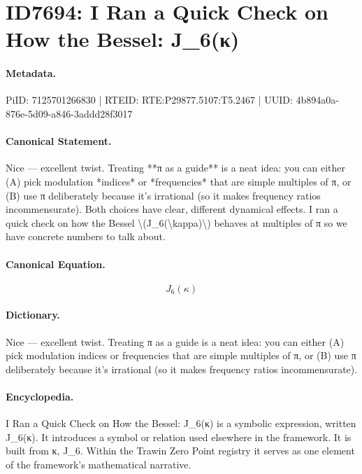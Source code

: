 \section*{ID7694: I Ran a Quick Check on How the Bessel: J\_6(κ)}
\paragraph{Metadata.}
PiID: 7125701266830 | RTEID: RTE:P29877.5107:T5.2467 | UUID: 4b894a0a-876e-5d09-a846-3addd28f3017

\paragraph{Canonical Statement.}
Nice — excellent twist. Treating **π as a guide** is a neat idea: you can either (A) pick modulation *indices* or *frequencies* that are simple multiples of π, or (B) use π deliberately because it’s irrational (so it makes frequency ratios incommensurate). Both choices have clear, different dynamical effects. I ran a quick check on how the Bessel \textbackslash{}(J\_6(\textbackslash{}kappa)\textbackslash{}) behaves at multiples of π so we have concrete numbers to talk about.

\paragraph{Canonical Equation.}
\[
J_6(\kappa)
\]

\paragraph{Dictionary.}
Nice — excellent twist. Treating π as a guide is a neat idea: you can either (A) pick modulation indices or frequencies that are simple multiples of π, or (B) use π deliberately because it’s irrational (so it makes frequency ratios incommensurate).

\paragraph{Encyclopedia.}
I Ran a Quick Check on How the Bessel: J\_6(κ) is a symbolic expression, written J\_6(κ). It introduces a symbol or relation used elsewhere in the framework. It is built from κ, J\_6. Within the Trawin Zero Point registry it serves as one element of the framework's mathematical narrative.
